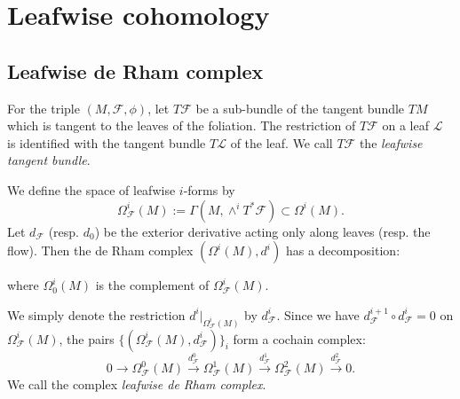 \section{Leafwise cohomology}


    \subsection{Leafwise de Rham complex}
    
    For the triple $(M,\mathcal{F},\phi)$, let $T\mathcal{F}$ be a sub-bundle of the tangent bundle $TM$ which is tangent to the leaves of the foliation.
    The restriction of $T\mathcal{F}$ on a leaf $\mathcal{L}$ is identified with the tangent bundle $T\mathcal{L}$ of the leaf.
    We call $T\mathcal{F}$ the \textit{leafwise tangent bundle}.

    We define the space of leafwise $i$-forms by
    \begin{equation*}
        \Omega^{i}_{\mathcal{F}}(M):=\Gamma(M,\wedge^{i}T^{*}\mathcal{F})\subset{\Omega^{i}(M)}.
    \end{equation*}
    Let $d_{\mathcal{F}}$ (resp. $d_{0}$) be the exterior derivative acting only along leaves (resp. the flow).
    Then the de Rham complex $(\Omega^{i}(M),d^{i})$  has a decomposition:
    \begin{center}
    \end{center}
    where $\Omega_{0}^{i}(M)$ is the complement of $\Omega^{i}_{\mathcal{F}}(M)$.
    
    We simply denote the restriction $d^{i}|_{\Omega^{i}_{\mathcal{F}}(M)}$ by $d_\mathcal{F}^{i}$.
    Since we have $d^{i+1}_{\mathcal{F}}\circ{d}^{i}_{\mathcal{F}}=0$ on $\Omega^{i}_{\mathcal{F}}(M)$, 
    the pairs $\{(\Omega^{i}_{\mathcal{F}}(M), d^{i}_{\mathcal{F}})\}_{i}$ form a cochain complex:
    \begin{equation*}
        0\overset{}{\rightarrow}\Omega^{0}_{\mathcal{F}}(M)\overset{d^{0}_{\mathcal{F}}}{\rightarrow}\Omega^{1}_{\mathcal{F}}(M)\overset{d^{1}_{\mathcal{F}}}{\rightarrow}\Omega^{2}_{\mathcal{F}}(M)\overset{d^{2}_{\mathcal{F}}}{\rightarrow}0.
    \end{equation*}
    We call the complex \textit{leafwise de Rham complex}.
    
